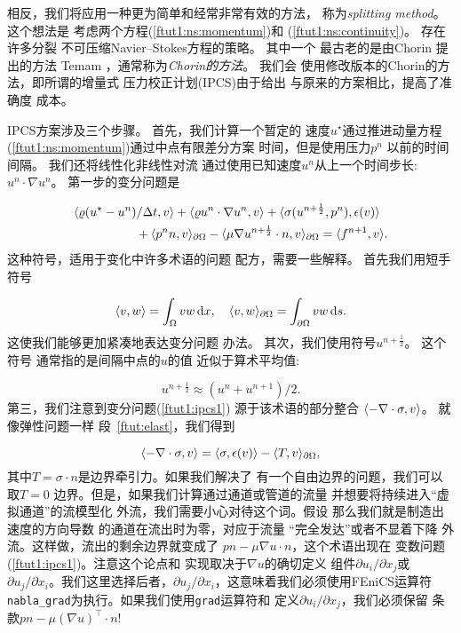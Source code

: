 
相反，我们将应用一种更为简单和经常非常有效的方法，
称为\emph{splitting method}。 这个想法是
考虑两个方程(\ref{ftut1:ns:momentum})和
(\ref{ftut1:ns:continuity})。 存在许多分裂
不可压缩Navier--Stokes方程的策略。 其中一个
最古老的是由Chorin \cite{Chorin1968}提出的方法
Temam \cite{Temam1969}，通常称为\emph{Chorin的方法}。 我们会
使用修改版本的Chorin的方法，即所谓的增量式
压力校正计划(IPCS)由于\cite{Goda1979}给出
与原来的方案相比，提高了准确度
成本。

IPCS方案涉及三个步骤。 首先，我们计算一个暂定的
速度$u^{\star}$通过推进动量方程
(\ref{ftut1:ns:momentum})通过中点有限差分方案
时间，但是使用压力$p^{n}$
以前的时间间隔。 我们还将线性化非线性对流
通过使用已知速度$u^{n}$从上一个时间步长:
$u^{n}\cdot\nabla u^{n}$。
第一步的变分问题是

\begin{align}
\label{ftut1:ipcs1}
      & \langle {\varrho(u^{\star} - u^{n}) / \dt},{v} \rangle
      + \langle {\varrho u^{n} \cdot \nabla u^{n}},{v} \rangle
      + \nonumber
        \langle {\sigma(u^{n+\frac{1}{2}}, p^{n})},{\epsilon(v)} \rangle \\
      &\quad\quad\quad\quad\quad
      + \langle {p^{n} n},{v} \rangle_{\partial\Omega}
      - \langle {\mu\nabla u^{n+\frac{1}{2}}\cdot n},{v} \rangle_{\partial\Omega}
      = \langle {f^{n+1}},{v} \rangle.
\end{align}
这种符号，适用于变化中许多术语的问题
配方，需要一些解释。 首先我们用短手
符号

\[
  \inner{v}{w} = \int_{\Omega} vw \dx, \quad
  \inner{v}{w}_{\partial\Omega} = \int_{\partial\Omega} vw \ds.
\]
这使我们能够更加紧凑地表达变分问题
办法。 其次，我们使用符号$u^{n +\frac{1}{2}}$。 这个符号
通常指的是间隔中点的$u$的值
近似于算术平均值:

\[
  u^{n+\frac{1}{2}} \approx (u^n + u^{n+1}) / 2.
\]
第三，我们注意到变分问题(\ref{ftut1:ipcs1})
源于该术语的部分整合
$\inner{-\nabla\cdot\sigma}{v}$。 就像弹性问题一样
段~\ref{ftut:elast}，我们得到

\[
  \inner{-\nabla\cdot\sigma}{v}
  = \inner{\sigma}{\epsilon(v)}
  - \inner{T}{v}_{\partial\Omega},
\]
其中$T = \sigma\cdot n$是边界牵引力。如果我们解决了
有一个自由边界的问题，我们可以取$T = 0$
边界。但是，如果我们计算通过通道或管道的流量
并想要将持续进入“虚拟通道”的流模型化
外流，我们需要小心对待这个词。假设
那么我们就是制造出速度的方向导数
的通道在流出时为零，对应于流量
“完全发达”或者不显着下降
外流。这样做，流出的剩余边界就变成了
$pn - \mu\nabla u \cdot n$，这个术语出现在
变数问题(\ref{ftut1:ipcs1})。注意这个论点和
实现取决于$\nabla u$的确切定义
组件$\partial u_i / \partial x_j$或
$\partial u_j / \partial x_i$。我们这里选择后者，$\partial
u_j / \partial x_i$，这意味着我们必须使用FEniCS运算符
\verb!nabla_grad!为执行。如果我们使用\texttt{grad}运算符和
定义$\partial u_i / \partial x_j$，我们必须保留
条款$pn - \mu(\nabla u)^{\top} \cdot n$!

